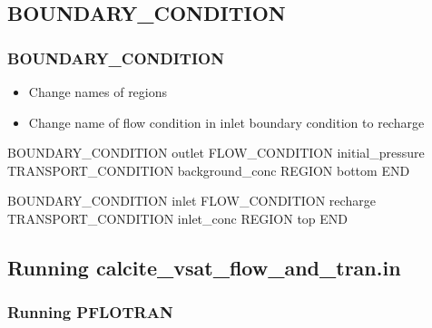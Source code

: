 \documentclass{beamer}
\newcommand\redcomment[1]{{{\color{red} #1}}}
\newcommand\greencomment[1]{{{\color{green} #1}}}
\newcommand\magentacomment[1]{{{\color{magenta} #1}}}
\begin{document}
\subsection{BOUNDARY\_CONDITION}

\begin{frame}[fragile]\frametitle{BOUNDARY\_CONDITION}

\begin{itemize}
\item Change names of regions
\item Change name of flow condition in \redcomment{inlet} boundary condition to \greencomment{recharge}
\end{itemize}

\begin{semiverbatim}

BOUNDARY_CONDITION outlet
  FLOW_CONDITION initial_pressure
  TRANSPORT_CONDITION background_conc
  REGION \magentacomment{bottom}
END

BOUNDARY_CONDITION inlet
  FLOW_CONDITION \magentacomment{recharge}
  TRANSPORT_CONDITION inlet_conc
  REGION \magentacomment{top}
END
\end{semiverbatim}

\end{frame}


\subsection{Running calcite_vsat_flow_and_tran.in}

\begin{frame}[fragile]\frametitle{Running PFLOTRAN}


\end{frame}
\end{document}
